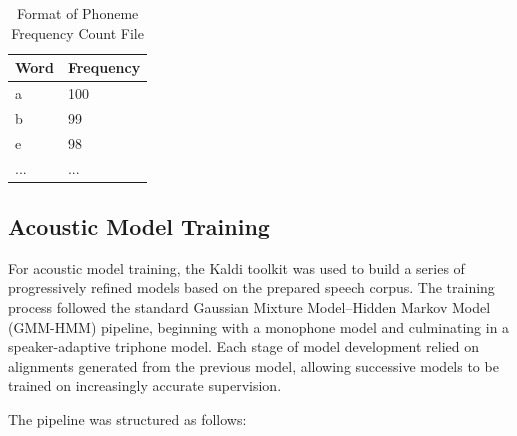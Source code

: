 \begin{table}[h]
\centering
\caption{Format of Phoneme Frequency Count File}
\label{tab:phoneme}
\begin{tabular}{ll}
\toprule
\textbf{Word} & \textbf{Frequency} \\
\midrule
a            & 100 \\
b            & 99  \\
e            & 98  \\
...           & ... \\
\bottomrule
\end{tabular}
\end{table}

\subsection{Acoustic Model Training}
For acoustic model training, the Kaldi toolkit was used to build a series of progressively refined models based on the prepared speech corpus. The training process followed the standard Gaussian Mixture Model–Hidden Markov Model (GMM-HMM) pipeline, beginning with a monophone model and culminating in a speaker-adaptive triphone model. Each stage of model development relied on alignments generated from the previous model, allowing successive models to be trained on increasingly accurate supervision.

The pipeline was structured as follows:

